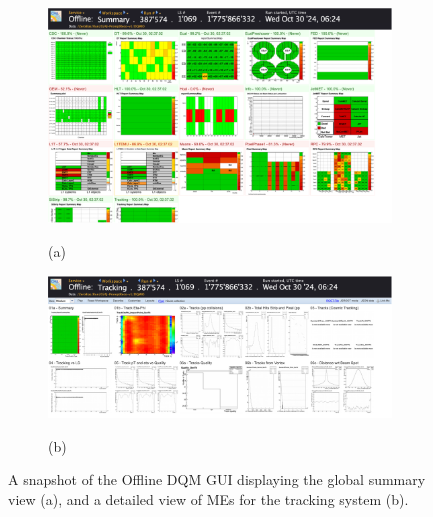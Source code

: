 \begin{figure}[H]
    \centering
    \begin{subfigure}[t]{1\textwidth}
        \centering
        \includegraphics[width=\textwidth]{images/dqm_gui.png}
        \label{fig:dqm_gui_1}
        \caption*{(a)} %
    \end{subfigure}

    \vspace{1em}

    \begin{subfigure}[t]{1\textwidth}
        \centering
        \includegraphics[width=\textwidth]{images/gui_tracker.png}
        \label{fig:dqm_gui_2}
        \caption*{(b)} %
    \end{subfigure}

    \caption{A snapshot of the Offline DQM GUI displaying the global summary view (a), and a detailed view of MEs for the tracking system (b).}
    \label{fig:dqm_gui}
\end{figure}
